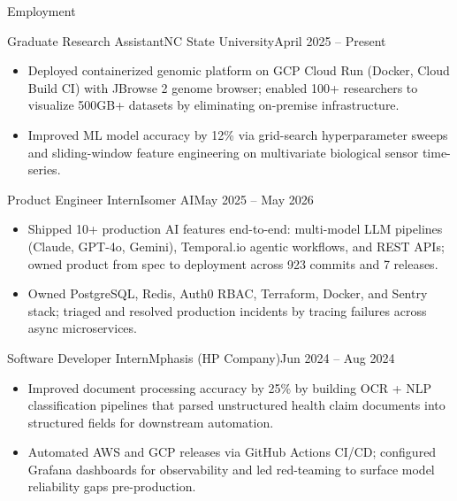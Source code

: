 \documentclass[]{mcdowellcv}
\begin{document}
\makeheader

\begin{cvsection}{Employment}
  \begin{cvsubsection}{Graduate Research Assistant}{NC State University}{April 2025 -- Present}
    \begin{itemize}
      \item Deployed containerized genomic platform on GCP Cloud Run (Docker, Cloud Build CI) with JBrowse 2 genome browser; enabled 100+ researchers to visualize 500GB+ datasets by eliminating on-premise infrastructure.
      \item Improved ML model accuracy by 12\% via grid-search hyperparameter sweeps and sliding-window feature engineering on multivariate biological sensor time-series.
    \end{itemize}
    \vspace{-1.5pt}
  \end{cvsubsection}

  \begin{cvsubsection}{Product Engineer Intern}{Isomer AI}{May 2025 -- May 2026}
    \begin{itemize}
      \item Shipped 10+ production AI features end-to-end: multi-model LLM pipelines (Claude, GPT-4o, Gemini), Temporal.io agentic workflows, and REST APIs; owned product from spec to deployment across 923 commits and 7 releases.
      \item Owned PostgreSQL, Redis, Auth0 RBAC, Terraform, Docker, and Sentry stack; triaged and resolved production incidents by tracing failures across async microservices.
    \end{itemize}
    \vspace{-1.5pt}
  \end{cvsubsection}

  \begin{cvsubsection}{Software Developer Intern}{Mphasis (HP Company)}{Jun 2024 -- Aug 2024}
    \begin{itemize}
      \item Improved document processing accuracy by 25\% by building OCR + NLP classification pipelines that parsed unstructured health claim documents into structured fields for downstream automation.
      \item Automated AWS and GCP releases via GitHub Actions CI/CD; configured Grafana dashboards for observability and led red-teaming to surface model reliability gaps pre-production.
    \end{itemize}
    \vspace{-1.5pt}
  \end{cvsubsection}


\end{cvsection}
\end{document}
